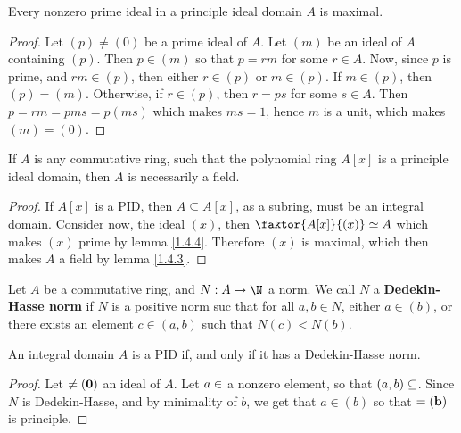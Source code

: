 \begin{lemma}\label{1.6.2}
    Every nonzero prime ideal in a principle ideal domain $A$ is maximal.
\end{lemma}
\begin{proof}
    Let $(p) \neq (0)$ be a prime ideal of $A$. Let $(m)$ be an ideal of $A$
    containing $(p)$. Then $p \in (m)$ so that $p=rm$ for some  $r \in A$. Now,
    since $p$ is prime, and $rm \in (p)$, then either $r \in (p)$ or $m \in
    (p)$. If $m \in (p)$, then $(p)=(m)$. Otherwise, if $r \in (p)$, then $r=ps$
    for some  $s \in A$. Then  $p=rm=pms=p(ms)$ which makes $ms=1$, hence $m$ is
    a unit, which makes $(m)=(0)$.
\end{proof}
\begin{corollary}
    If $A$ is any commutative ring, such that the polynomial ring $A[x]$ is a
    principle ideal domain, then $A$ is necessarily a field.
\end{corollary}
\begin{proof}
    If $A[x]$ is a PID, then $A \subseteq A[x]$, as a subring, must be an
    integral domain. Consider now, the ideal $(x)$, then $\faktor{A[x]}{(x)}
    \simeq A$ which makes $(x)$ prime by lemma \ref{1.4.4}. Therefore $(x)$ is
    maximal, which then makes $A$ a field by lemma \ref{1.4.3}.
\end{proof}

\begin{definition}
    Let $A$ be a commutative ring, and  $N:A \xrightarrow{} \N$ a norm. We call
    $N$ a \textbf{Dedekin-Hasse norm} if $N$ is a positive norm suc that for
    all $a,b \in N$, either $a \in (b)$, or there exists an element $c \in
    (a,b)$ such that $N(c)<N(b)$.
\end{definition}

\begin{lemma}\label{1.6.3}
    An integral domain $A$ is a PID if, and only if it has a Dedekin-Hasse norm.
\end{lemma}
\begin{proof}
    Let $\bf \neq (0)$ an ideal of $A$. Let $a \in \bf$ a nonzero element, so that
    $(a,b) \subseteq \bf$. Since $N$ is Dedekin-Hasse, and by minimality of $b$,
    we get that $a \in (b)$ so that $\bf=(b)$ is principle.
\end{proof}

